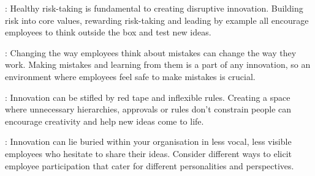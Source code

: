 \documentclass[a4paper,12pt]{extarticle}
\begin{document}
\begin{description}[font=$\bullet$~\normalfont\scshape\color{red!50!black}]

\item[Encourage risk-taking]: Healthy risk-taking is fundamental to creating disruptive innovation. Building risk into core values, rewarding risk-taking and leading by example all encourage employees to think outside the box and test new ideas. 

\item[ Make mistakes OK]: Changing the way employees think about mistakes can change the way they work. Making mistakes and learning from them is a part of any innovation, so an environment where employees feel safe to make mistakes is crucial. 

\item[Break through barriers]: Innovation can be stifled by red tape and inflexible rules. Creating a space where unnecessary hierarchies, approvals or rules don’t constrain people can encourage creativity and help new ideas come to life.

\item[Tap into different ways of thinking]: Innovation can lie buried within your organisation in less vocal, less visible employees who hesitate to share their ideas. Consider different ways to elicit employee participation that cater for different personalities and perspectives.

\end{description}


 
 




   
\end{document}
